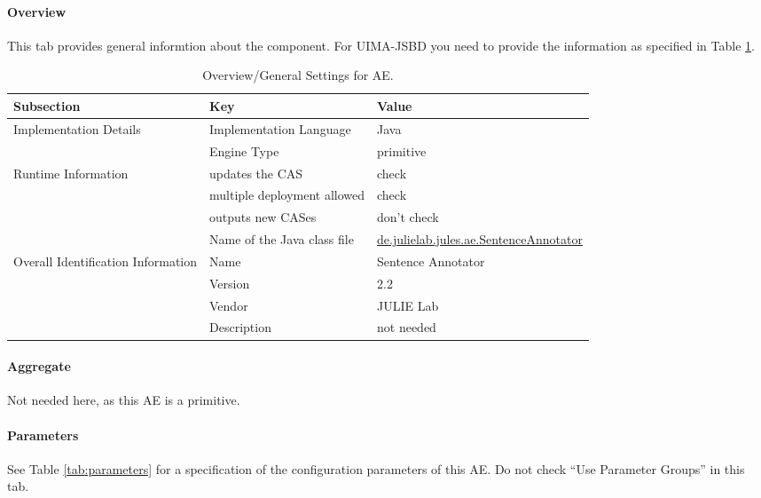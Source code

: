 \documentclass[11pt,a4paper,halfparskip]{scrartcl}
\begin{document}
\paragraph{Overview}
This tab provides general informtion about the component. For 
UIMA-JSBD you need to provide the information as specified in Table
\ref{tab:overview}.

\begin{table}[h!]
  \centering
  \begin{tabular}{|p{3.5cm}|p{4cm}|p{6cm}|}
    \hline
    Subsection & Key & Value \\
    \hline\hline
    Implementation Details & Implementation Language & Java \\
    \cline{2-3}
    & Engine Type & primitive \\
    \hline
    Runtime Information & updates the CAS & check \\
    \cline{2-3}
    & multiple deployment allowed & check \\
    \cline{2-3}
    & outputs new CASes &  don't check \\
    \cline{2-3}
    & Name of the Java class file & \url{de.julielab.jules.ae.SentenceAnnotator}\\
    \hline
    Overall Identification Information & Name &  Sentence Annotator \\
    \cline{2-3}
    & Version &  2.2 \\
    \cline{2-3}
    & Vendor & JULIE Lab\\
    \cline{2-3}
    & Description & not needed\\
    \hline
  \end{tabular}
  \caption{Overview/General Settings for AE.}
  \label{tab:overview}
\end{table}


\paragraph{Aggregate}
Not needed here, as this AE is a primitive.

\paragraph{Parameters}
\label{sss:parameters}

See Table \ref{tab:parameters} for a specification of the
configuration parameters of this AE. Do not check ``Use Parameter
Groups'' in this tab.
\end{document}
